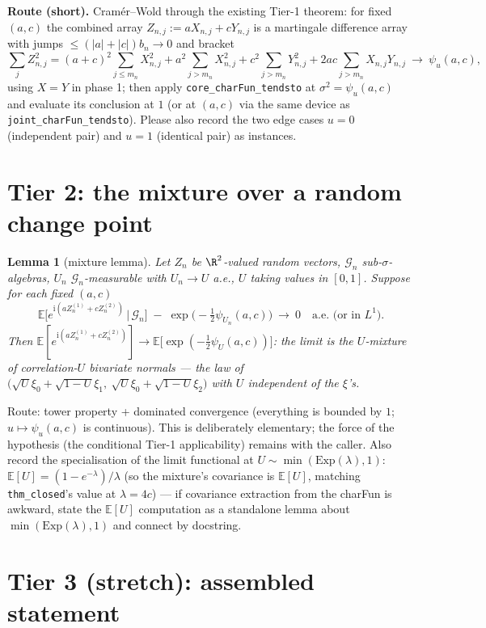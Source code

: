 \documentclass[11pt]{article}
\theoremstyle{plain}
\newtheorem{lemma}{Lemma}
\theoremstyle{remark}
\newcommand{\E}{\mathbb{E}}\newcommand{\PP}{\mathbb{P}}
\begin{document}
\noindent\textbf{Route (short).} Cram\'er--Wold through the existing Tier-1
theorem: for fixed $(a,c)$ the combined array $Z_{n,j}:=aX_{n,j}+cY_{n,j}$ is a
martingale difference array with jumps $\le(|a|+|c|)b_n\to0$ and bracket
\[
  \sum_jZ_{n,j}^2
  =(a+c)^2\!\sum_{j\le m_n}\!X_{n,j}^2
  +a^2\!\sum_{j>m_n}\!X_{n,j}^2+c^2\!\sum_{j>m_n}\!Y_{n,j}^2
  +2ac\!\sum_{j>m_n}\!X_{n,j}Y_{n,j}
  \ \to\ \psi_u(a,c),
\]
using $X=Y$ in phase 1; then apply
\texttt{core\_charFun\_tendsto} at $\sigma^2=\psi_u(a,c)$ and evaluate its
conclusion at $1$ (or at $(a,c)$ via the same device as
\texttt{joint\_charFun\_tendsto}). Please also record the two edge cases
$u=0$ (independent pair) and $u=1$ (identical pair) as instances.

\section*{Tier 2: the mixture over a random change point}

\begin{lemma}[mixture lemma]\label{lem:mix}
Let $Z_n$ be $\R^2$-valued random vectors, $\mathcal G_n$ sub-$\sigma$-algebras,
$U_n$ $\mathcal G_n$-measurable with $U_n\to U$ a.e., $U$ taking values in
$[0,1]$. Suppose for each fixed $(a,c)$
\[
  \E\big[e^{\mathrm i(aZ_n^{(1)}+cZ_n^{(2)})}\,\big|\,\mathcal G_n\big]
  \;-\;\exp\big(-\tfrac12\psi_{U_n}(a,c)\big)\ \longrightarrow\ 0
  \quad\text{a.e.\ (or in } L^1).
\]
Then
$\E[e^{\mathrm i(aZ_n^{(1)}+cZ_n^{(2)})}]\to
\E\big[\exp(-\tfrac12\psi_U(a,c))\big]$: the limit is the $U$-mixture of
correlation-$U$ bivariate normals --- the law of
$\big(\sqrt U\xi_0+\sqrt{1-U}\xi_1,\ \sqrt U\xi_0+\sqrt{1-U}\xi_2\big)$ with
$U$ independent of the $\xi$'s.
\end{lemma}

\noindent Route: tower property + dominated convergence (everything is bounded
by $1$; $u\mapsto\psi_u(a,c)$ is continuous). This is deliberately elementary;
the force of the hypothesis (the conditional Tier-1 applicability) remains with
the caller. Also record the specialisation of the limit functional at
$U\sim\min(\mathrm{Exp}(\lambda),1)$:
$\E[U]=(1-e^{-\lambda})/\lambda$ (so the mixture's covariance is
$\E[U]$, matching \texttt{thm\_closed}'s value at $\lambda=4c$) --- if
covariance extraction from the charFun is awkward, state the $\E[U]$
computation as a standalone lemma about $\min(\mathrm{Exp}(\lambda),1)$ and
connect by docstring.

\section*{Tier 3 (stretch): assembled statement}
\end{document}

